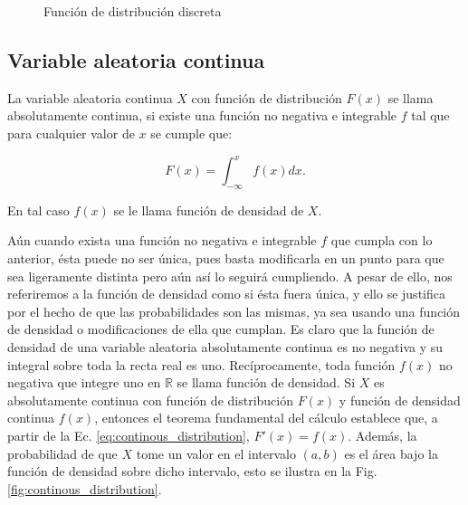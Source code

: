 \begin{figure}[h!]
    \centering
{}
\label{fig: discrete_function}
\caption{Función de distribución discreta}
\end{figure}


\subsection{Variable aleatoria continua}

\begin{tcolorbox}[colback=gray!5!white,colframe=gray!60!black,title=Definición: Variable aleatoria continua]
La variable aleatoria continua $X$ con función de distribución $F(x)$ se llama
absolutamente continua, si existe una función no negativa e integrable $f$ tal que
para cualquier valor de $x$ se cumple que:

\begin{equation}
    F(x) = \int_{- \infty}^{x} f(x) dx.
    \label{eq:continous_distribution}
\end{equation}

En tal caso $f(x)$ se le llama función de densidad de $X$.

\end{tcolorbox}

Aún cuando exista una función no negativa e integrable $f$ que cumpla con lo
anterior, ésta puede no ser única, pues basta modificarla en un punto para que
sea ligeramente distinta pero aún así lo seguirá cumpliendo. A pesar de ello,
nos referiremos a la función de densidad como si ésta fuera única, y ello se
justifica por el hecho de que las probabilidades son las mismas, ya sea usando
una función de densidad o modificaciones de ella que cumplan. Es claro que la
función de densidad de una variable aleatoria absolutamente continua es no
negativa y su integral sobre toda la recta real es uno. Recíprocamente, toda
función $f(x)$ no negativa que integre uno en $\mathbb{R}$ se llama función de
densidad. Si $X$ es absolutamente continua con función de distribución $F(x)$ y
función de densidad continua $f(x)$, entonces el teorema fundamental del cálculo
establece que, a partir de la Ec. \eqref{eq:continous_distribution}, $F'(x) = f
(x)$. Además, la probabilidad de que $X$ tome un valor en el intervalo $(a, b)$
es el área bajo la función de densidad sobre dicho intervalo, esto se ilustra en
la Fig. \ref{fig:continous_distribution}.

